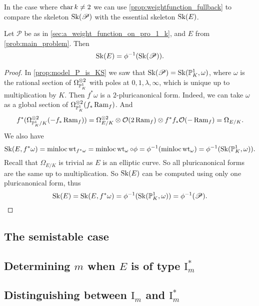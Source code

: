 In the case where $\operatorname{char} k \ne 2$ we can use \cref{prop:weightfunction_fullback} to compare the skeleton $\operatorname{Sk}(\mathscr P)$ with the essential skeleton $\operatorname{Sk}(E)$. 
\begin{lemma}\label{lem:sk_E_pulls_back}
	Let $\mathscr P$ be as in \cref{sec:a_weight_function_on_pro_1_k}, and $E$ from \cref{prob:main_problem}. 
	Then \[
		\sk(E) = \phi^{-1}(\sk(\mathscr P))
	.\] 
\end{lemma}
\begin{proof}
	In \cref{prop:model_P_is_KS} we saw that $\operatorname{Sk}(\mathscr P) = \operatorname{Sk}(\mathbb{P}^{1}_K, \omega)$, where $\omega$ is the rational section of $\Omega_{\mathbb{P}^{1}_K}^{\otimes 2}$ with poles at $0, 1, \lambda, \infty$, which is unique up to multiplication by $K$. 
	Then $f^* \omega$ is a $2$-pluricanonical form. 
	Indeed, we can take $\omega$ as a global section of $\Omega_{\mathbb{P}^{1}_K}^{\otimes 2}(f_* \operatorname{Ram} _f)$. 
	And 
	\[
		f^* (\Omega_{\mathbb{P}^{1}_K / K}^{\otimes 2}(-f_* \operatorname{Ram} _f)) = \Omega_{E /K}^{\otimes 2} \otimes \mathcal{O}(2 \operatorname{Ram}_f) \otimes f^*f_* \mathcal{O}(-\operatorname{Ram} _f) = \Omega_{E / K}
	.\] 
	We also have 
	\[
		\sk(E, f^*\omega) = \minloc \wt_{f^* \omega} = \minloc \wt_{\omega}\circ \phi = \phi^{-1}(\minloc \wt_\omega) = \phi^{-1} (\sk(\pro^{1}_K, \omega))
	.\] 
	Recall that $\Omega_{E / K}$ is trivial as $E$ is an elliptic curve. 
	So all pluricanonical forms are the same up to multiplication. 
	So $\operatorname{Sk}(E)$ can be computed using only one pluricanonical form, thus \[
		\sk(E) = \sk(E, f^*\omega) = \phi^{-1}(\sk(\pro^{1}_K, \omega)) = \phi^{-1}(\mathscr P)
	.\] 
\end{proof}

\subsection{The semistable case} \label{sec:the_semistable_case}


\subsection{Determining $m$ when $E$ is of type $\mathrm I_m^*$} \label{sec:determining_m_when_e_is_of_type_ims}


\subsection{Distinguishing between $\mathrm I_m$ and  $\mathrm I_m^*$} \label{sec:distinguishing_between_im_and_ims}

